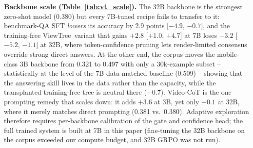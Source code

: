\documentclass[sigconf,10pt]{acmart}
\newcommand{\system}{ViewTree\xspace}
\begin{document}
\noindent\textbf{Backbone scale (Table~\ref{tab:vt_scale}).} The 32B backbone is the strongest zero-shot model (0.380) but every 7B-tuned recipe fails to transfer to it: benchmark-QA SFT \emph{lowers} its accuracy by 2.9 points [$-4.9$, $-0.7$], and the training-free \system~variant that gains $+2.8$ [$+1.0$, $+4.7$] at 7B loses $-3.2$ [$-5.2$, $-1.1$] at 32B, where token-confidence pruning lets render-limited consensus override strong direct answers. At the other end, the corpus moves the mobile-class 3B backbone from 0.321 to 0.497 with only a 30k-example subset -- statistically at the level of the 7B data-matched baseline (0.509) -- showing that the answering skill lives in the data rather than the capacity, while the transplanted training-free tree is neutral there ($-0.7$). Video-CoT is the one prompting remedy that scales down: it adds $+3.6$ at 3B, yet only $+0.1$ at 32B, where it merely matches direct prompting (0.381 vs.\ 0.380). Adaptive exploration therefore requires per-backbone calibration of the gate and confidence head; the full trained system is built at 7B in this paper (fine-tuning the 32B backbone on the corpus exceeded our compute budget, and 32B GRPO was not run).
\end{document}
